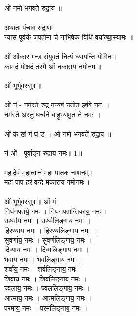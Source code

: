 \section{}
\subsection{}
ओं नमो भगवते॑ रुद्रा॒य ॥\\
\\
अथातः पंचाग रुद्राणां\\
न्यास पूर्वकं जपहोमा	र्च नाभिषेक विधिं वया᳚ख्या॒स्यामः ॥\\
\\
ओं  ओंकार मन्त्र संयुक्तं नित्यं ध्यायन्ति योगिनः।\\
कामदं मोक्षदं तस्मै ओं नकाराय नमोनमः॥\\
\\
ओं भूर्भुवस्सुवः॑॥ \\
\\
ओं नं - नम॑स्ते रुद्र म॒न्यव॑ उ॒तोत॒ इष॑वे॒ नम॑: ।\\
नम॑स्ते अस्तु॒ धन्व॑ने बा॒हुभ्या॑मु॒त ते॒ नम॑: ।\\
\\
ओं कं खं गं घं डं । ओं नमो भगवते॑ रुद्रा॒य ॥\\
\\
नं ओं - पूर्वाङ्ग रुद्राय नमः॥ 1॥\\
\\
महादेवं महात्मानं महा पातक नाशनम्।\\
महा पाप हरं वन्दे मकाराय नमोनमः॥\\
\\
ओं भूर्भुवस्सुवः॑॥ ओं मं \\
निध॑नपतये॒ नमः । निध॑नपतान्तिकाय॒ नमः ।\\
ऊर्ध्वाय॒ नमः । ऊर्ध्वलिङ्गाय॒ नमः ।\\
हिरण्याय॒ नमः । हिरण्यलिङ्गाय॒ नमः ।\\
सुवर्णाय॒ नमः । सुवर्णलिङ्गाय॒ नमः ।\\
दिव्याय॒ नमः । दिव्यलिङ्गाय॒ नमः ।\\
भवाय॒ नमः । भवलिङ्गाय॒ नमः ।\\
शर्वाय॒ नमः । शर्वलिङ्गाय॒ नमः ।\\
शिवाय॒ नमः । शिवलिङ्गाय॒ नमः ।\\
ज्वलाय॒ नमः । ज्वललिङ्गाय॒ नमः ।\\
आत्माय॒ नमः । आत्मलिङ्गाय॒ नमः ।\\
परमाय॒ नमः । परमलिङ्गाय॒ नमः ।\\
